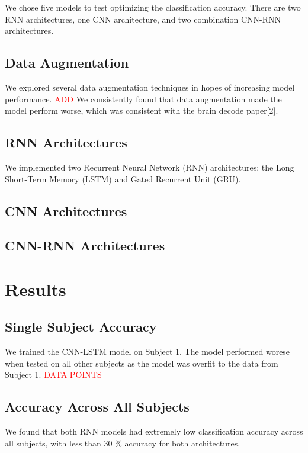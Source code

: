 \documentclass[10pt,twocolumn,letterpaper]{article}
\begin{document}
We chose five models to test optimizing the classification accuracy. There are
two RNN architectures, one CNN architecture, and two combination CNN-RNN
architectures.

\subsection{Data Augmentation}
We explored several data augmentation techniques in hopes of increasing model
performance. \textcolor{red}{ADD} We consistently found that data augmentation
made the model perform worse, which was consistent with the brain decode
paper[2].

\subsection{RNN Architectures}
We implemented two Recurrent Neural Network (RNN) architectures: the Long
Short-Term Memory (LSTM) and Gated Recurrent Unit (GRU).

\subsection{CNN Architectures}

\subsection{CNN-RNN Architectures}


\section{Results}

\subsection{Single Subject Accuracy}
We trained the CNN-LSTM model on Subject 1. The model performed worese when
tested on all other subjects as the model was overfit to the data from Subject
1. \textcolor{red}{DATA POINTS}

\subsection{Accuracy Across All Subjects}
We found that both RNN models had extremely low classification accuracy across
all subjects, with less than 30 \% accuracy for both architectures.
\end{document}
